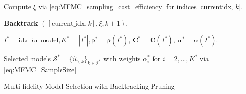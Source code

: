 \begin{algorithm}[!ht]
{{{     %

     

        
        Compute $\xi$ via \eqref{eq:MFMC_sampling_cost_efficiency} for indices  
      [current\textunderscore idx, $k$].

      
      \textbf{Backtrack} $(\, [\text{current}\_\text{idx},k],\xi, k+1)$.
  }
}
}
\vspace{3mm} 


 
$I^* = \text{idx}\_\text{for}\_\text{model}, K^* = |I^*|, \boldsymbol{\rho}^* = \boldsymbol{\rho} (I^*)$, $\boldsymbol{C}^* = \boldsymbol{C} (I^*)$, $\boldsymbol{\sigma}^* = \boldsymbol{\sigma} (I^*)$.

Selected models $\mathcal{S}^* = \{\widehat u_{h,k}\}_{k\in \mathcal{I^*}}$ with weights $\alpha_i^*$ for $i=2,...,K^*$ via \eqref{eq:MFMC_SampleSize}.




\caption{Multi-fidelity Model Selection with Backtracking Pruning}
\end{algorithm}
\ULforem




